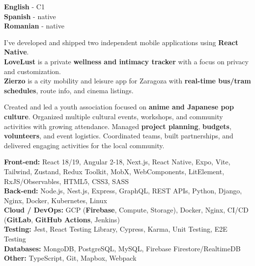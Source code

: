 \documentclass[9pt]{developercv} %
\begin{document}
\begin{minipage}[t]{0.3\textwidth}
	\vspace{-\baselineskip}


	\textbf{English} - C1\\
	\textbf{Spanish} - native\\
	\textbf{Romanian} - native
\end{minipage}
\hfill
\begin{minipage}[t]{0.3\textwidth}
	\vspace{-\baselineskip}
	
	I've developed and shipped two independent mobile applications using \textbf{React Native}.
	\\
	\textbf{LoveLust} is a private \textbf{wellness and intimacy tracker} with a focus on privacy and customization.
	\\
	\textbf{Zierzo} is a city mobility and leisure app for Zaragoza with \textbf{real-time bus/tram schedules}, route info, and cinema listings.

\end{minipage}
\hfill
\begin{minipage}[t]{0.3\textwidth}
	\vspace{-\baselineskip}
	
	Created and led a youth association focused on \textbf{anime and Japanese pop culture}. Organized multiple cultural events, workshops, and community activities with growing attendance. Managed \textbf{project planning}, \textbf{budgets}, \textbf{volunteers}, and event logistics. Coordinated teams, built partnerships, and delivered engaging activities for the local community.
\end{minipage}
\hfill
\begin{minipage}[t]{1\textwidth}
	\vspace{-\baselineskip}
	
	\textbf{Front-end:} React 18/19, Angular 2-18, Next.js, React Native, Expo, Vite, Tailwind, Zustand, Redux Toolkit, MobX, WebComponents, LitElement, RxJS/Observables, HTML5, CSS3, SASS \\
	\textbf{Back-end:} Node.js, Nest.js, Express, GraphQL, REST APIs, Python, Django, Nginx, Docker, Kubernetes, Linux \\
	\textbf{Cloud / DevOps:} GCP (\textbf{Firebase}, Compute, Storage), Docker, Nginx, CI/CD (\textbf{GitLab}, \textbf{GitHub Actions}, Jenkins) \\
	\textbf{Testing:} Jest, React Testing Library, Cypress, Karma, Unit Testing, E2E Testing \\
	\textbf{Databases:} MongoDB, PostgreSQL, MySQL, Firebase Firestore/RealtimeDB \\
	\textbf{Other:} TypeScript, Git, Mapbox, Webpack
\end{minipage}
\end{document}

